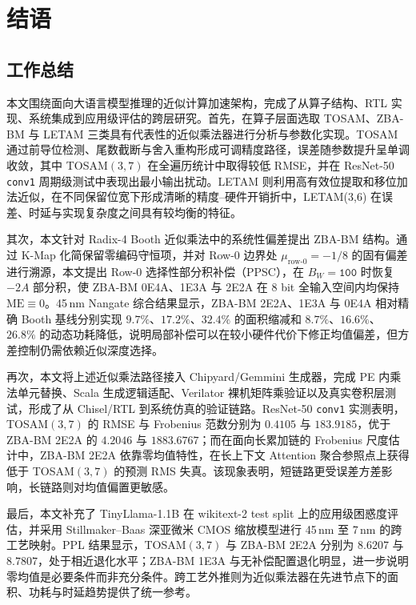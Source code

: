 \documentclass[12pt,a4paper,UTF8]{article}
\begin{document}
\clearpage
\section{结语}

\subsection{工作总结}
本文围绕面向大语言模型推理的近似计算加速架构，完成了从算子结构、RTL 实现、系统集成到应用级评估的跨层研究。首先，在算子层面选取 TOSAM、ZBA-BM 与 LETAM 三类具有代表性的近似乘法器进行分析与参数化实现。TOSAM 通过前导位检测、尾数截断与舍入重构形成可调精度路径，误差随参数提升呈单调收敛，其中 TOSAM$(3,7)$ 在全遍历统计中取得较低 RMSE，并在 ResNet-50 \texttt{conv1} 周期级测试中表现出最小输出扰动。LETAM 则利用高有效位提取和移位加法近似，在不同保留位宽下形成清晰的精度--硬件开销折中，LETAM(3,6) 在误差、时延与实现复杂度之间具有较均衡的特征。

其次，本文针对 Radix-4 Booth 近似乘法中的系统性偏差提出 ZBA-BM 结构。通过 K-Map 化简保留零编码守恒项，并对 Row-0 边界处 $\mu_{\text{row-0}}=-1/8$ 的固有偏差进行溯源，本文提出 Row-0 选择性部分积补偿（PPSC），在 $B_W=\mathtt{100}$ 时恢复 $-2A$ 部分积，使 ZBA-BM 0E4A、1E3A 与 2E2A 在 8 bit 全输入空间内均保持 $\mathrm{ME}\equiv0$。45\,nm Nangate 综合结果显示，ZBA-BM 2E2A、1E3A 与 0E4A 相对精确 Booth 基线分别实现 $9.7\%$、$17.2\%$、$32.4\%$ 的面积缩减和 $8.7\%$、$16.6\%$、$26.8\%$ 的动态功耗降低，说明局部补偿可以在较小硬件代价下修正均值偏差，但方差控制仍需依赖近似深度选择。

再次，本文将上述近似乘法路径接入 Chipyard/Gemmini 生成器，完成 PE 内乘法单元替换、Scala 生成逻辑适配、Verilator 裸机矩阵乘验证以及真实卷积层测试，形成了从 Chisel/RTL 到系统仿真的验证链路。ResNet-50 \texttt{conv1} 实测表明，TOSAM$(3,7)$ 的 RMSE 与 Frobenius 范数分别为 $0.4105$ 与 $183.9185$，优于 ZBA-BM 2E2A 的 $4.2046$ 与 $1883.6767$；而在面向长累加链的 Frobenius 尺度估计中，ZBA-BM 2E2A 依靠零均值特性，在长上下文 Attention 聚合参照点上获得低于 TOSAM$(3,7)$ 的预测 RMS 失真。该现象表明，短链路更受误差方差影响，长链路则对均值偏置更敏感。

最后，本文补充了 TinyLlama-1.1B 在 wikitext-2 test split 上的应用级困惑度评估，并采用 Stillmaker--Baas 深亚微米 CMOS 缩放模型进行 45\,nm 至 7\,nm 的跨工艺映射。PPL 结果显示，TOSAM$(3,7)$ 与 ZBA-BM 2E2A 分别为 $8.6207$ 与 $8.7807$，处于相近退化水平；ZBA-BM 1E3A 与无补偿配置退化明显，进一步说明零均值是必要条件而非充分条件。跨工艺外推则为近似乘法器在先进节点下的面积、功耗与时延趋势提供了统一参考。
\end{document}
